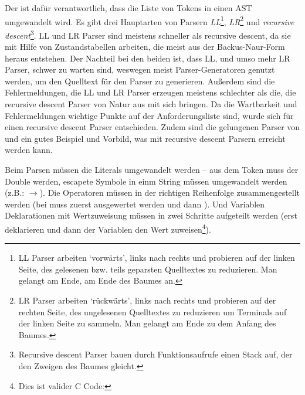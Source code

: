       Der  ist dafür verantwortlich, dass die Liste von Tokens in einen AST umgewandelt wird. Es gibt drei Hauptarten von Parsern\autocite[S.77\,f.]{eirund2013formale} \emph{LL}\footnote{
        LL Parser arbeiten `vorwärts', links nach rechts und probieren auf der linken Seite, des gelesenen bzw. teils geparsten Quelltextes zu reduzieren. Man gelangt am Ende, am Ende des Baumes an.
      }, \emph{LR}\footnote{
        LR Parser arbeiten `rückwärts', links nach rechts und probieren auf der rechten Seite, des ungelesenen Quelltextes zu reduzieren um Terminals auf der linken Seite zu sammeln. Man gelangt am Ende zu dem Anfang des Baumes.\autocite{cs143-stanford}
      } und \emph{recursive descent}\footnote{
        Recursive descent Parser bauen durch Funktionsaufrufe einen Stack auf, der den Zweigen des Baumes gleicht.
      }.
      LL und LR Parser sind meistens schneller als recursive descent, da sie mit Hilfe von Zustandstabellen arbeiten, die meist aus der Backus-Naur-Form heraus entstehen. Der Nachteil bei den beiden ist, dass LL, und umso mehr LR Parser, schwer zu warten sind, weswegen meist Parser-Generatoren genutzt werden, um den Quelltext für den Parser zu generieren. Außerdem sind die Fehlermeldungen, die LL und LR Parser erzeugen meistens schlechter als die, die recursive descent Parser von Natur aus mit sich bringen\autocite{scott2010gll}. Da die Wartbarkeit und Fehlermeldungen wichtige Punkte auf der Anforderungsliste sind, wurde sich für einen recursive descent Parser entschieden. Zudem sind die gelungenen Parser von  und  ein gutes Beispiel und Vorbild, was mit recursive descent Parsern erreicht werden kann.

      Beim Parsen müssen die Literals umgewandelt werden -- aus dem Token  muss der Double  werden, escapete Symbole in einm String müssen umgewandelt werden (z.B.: $\rightarrow$). Die Operatoren müssen in der richtigen Reihenfolge zusammengestellt werden (bei  muss  zuerst ausgewertet werden und dann ). Und Variablen Deklarationen mit Wertzuweisung müssen in zwei Schritte aufgeteilt werden (erst deklarieren und dann der Variablen den Wert zuweisen\footnote{
        Dies ist valider C Code: 
      }).

